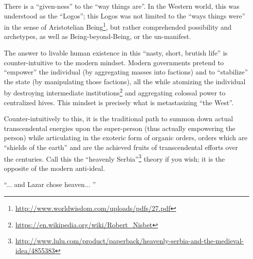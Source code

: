 There is a ``given-ness'' to the ``way things are''. In the Western world, this was understood as the ``Logos''; this Logos was not limited to the ``ways things were'' in the sense of Aristotelian Being\footnote{\url{http://www.worldwisdom.com/uploads/pdfs/27.pdf}}, but rather comprehended possibility and archetypes, as well as Being-beyond-Being, or the un-manifest.

The answer to livable human existence in this ``nasty, short, brutish life'' is counter-intuitive to the modern mindset. Modern governments pretend to ``empower'' the individual (by aggregating masses into factions) and to ``stabilize'' the state (by manipulating those factions), all the while atomizing the individual by destroying intermediate institutions\footnote{\url{https://en.wikipedia.org/wiki/Robert\_Nisbet}} and aggregating colossal power to centralized hives. This mindset is precisely what is metastasizing ``the West''.

Counter-intuitively to this, it is the traditional path to summon down actual transcendental energies upon the super-person (thus actually empowering the person) while articulating in the exoteric form of organic orders, orders which are ``shields of the earth'' and are the achieved fruits of transcendental efforts over the centuries. Call this the ``heavenly Serbia''\footnote{\url{http://www.lulu.com/product/paperback/heavenly-serbia-and-the-medieval-idea/4855383}} theory if you wish; it is the opposite of the modern anti-ideal.

``... and Lazar chose heaven... ''




